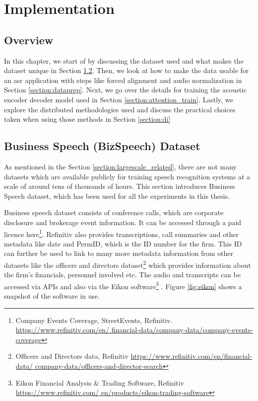 \chapter{Implementation}
\label{chapter:methods}

\section{Overview}
In this chapter, we start of by discussing the dataset used and what makes the dataset unique in Section \ref{section:bizspeech}. Then, we look at how to make the data usable for an \acrshort{asr} application with steps like forced alignment and audio normalization in Section \ref{section:dataprep}. Next, we go over the details for training the acoustic encoder decoder model used in Section \ref{section:attention_train}. Lastly, we explore the distributed methodologies used and discuss the practical choices taken when using those methods in Section \ref{section:di}



\section{Business Speech (BizSpeech) Dataset}
\label{section:bizspeech}
As mentioned in the Section \ref{section:largescale_related}, there are not many datasets which are available publicly for training speech recognition systems at a scale of around tens of thousands of hours. This section introduces Business Speech dataset, which has been used for all the experiments in this thesis. 

Business speech dataset consists of conference calls, which are corporate disclosure and brokerage event information. It can be accessed through a paid licence here\footnote{Company Events Coverage, StreetEvents, Refinitiv. \href{https://www.refinitiv.com/en/financial-data/company-data/company-events-coverage}{https://www.refinitiv.com/en/ financial-data/company-data/company-events-coverage}}. Refinitiv also provides transcriptions, call summaries and other metadata like date and PermID, which is the ID number for the firm. This ID can further be used to link to many more metadata information from other datasets like the officers and directors dataset\footnote{Officers and Directors data, Refinitiv \href{https://www.refinitiv.com/en/financial-data/company-data/officers-and-director-search}{https://www.refinitiv.com/en/financial-data/ company-data/officers-and-director-search}} which provides information about the firm's financials, personnel involved etc. The audio and transcripts can be accessed via APIs and also via the Eikon software\footnote{Eikon Financial Analysis \& Trading Software, Refinitiv \href{https://www.refinitiv.com/en/products/eikon-trading-software}{https://www.refinitiv.com/ en/products/eikon-trading-software}} \cite{August2011ThomsonEikon}. Figure \ref{fig:eikon} shows a snapshot of the software in use.

